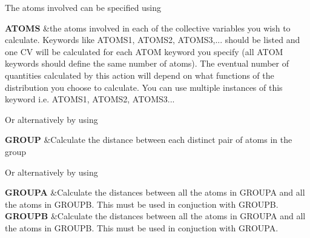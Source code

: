 \begin{DoxyParagraph}{The atoms involved can be specified using}

\end{DoxyParagraph}
\begin{TabularC}{2}
\hline
{\bfseries  A\+T\+O\+M\+S } &the atoms involved in each of the collective variables you wish to calculate. Keywords like A\+T\+O\+M\+S1, A\+T\+O\+M\+S2, A\+T\+O\+M\+S3,... should be listed and one C\+V will be calculated for each A\+T\+O\+M keyword you specify (all A\+T\+O\+M keywords should define the same number of atoms). The eventual number of quantities calculated by this action will depend on what functions of the distribution you choose to calculate. You can use multiple instances of this keyword i.\+e. A\+T\+O\+M\+S1, A\+T\+O\+M\+S2, A\+T\+O\+M\+S3...   \\
\end{TabularC}


\begin{DoxyParagraph}{Or alternatively by using}

\end{DoxyParagraph}
\begin{TabularC}{2}
\hline
{\bfseries  G\+R\+O\+U\+P } &Calculate the distance between each distinct pair of atoms in the group   \\
\end{TabularC}


\begin{DoxyParagraph}{Or alternatively by using}

\end{DoxyParagraph}
\begin{TabularC}{2}
\hline
{\bfseries  G\+R\+O\+U\+P\+A } &Calculate the distances between all the atoms in G\+R\+O\+U\+P\+A and all the atoms in G\+R\+O\+U\+P\+B. This must be used in conjuction with G\+R\+O\+U\+P\+B.   \\
{\bfseries  G\+R\+O\+U\+P\+B } &Calculate the distances between all the atoms in G\+R\+O\+U\+P\+A and all the atoms in G\+R\+O\+U\+P\+B. This must be used in conjuction with G\+R\+O\+U\+P\+A.   \\
\end{TabularC}


